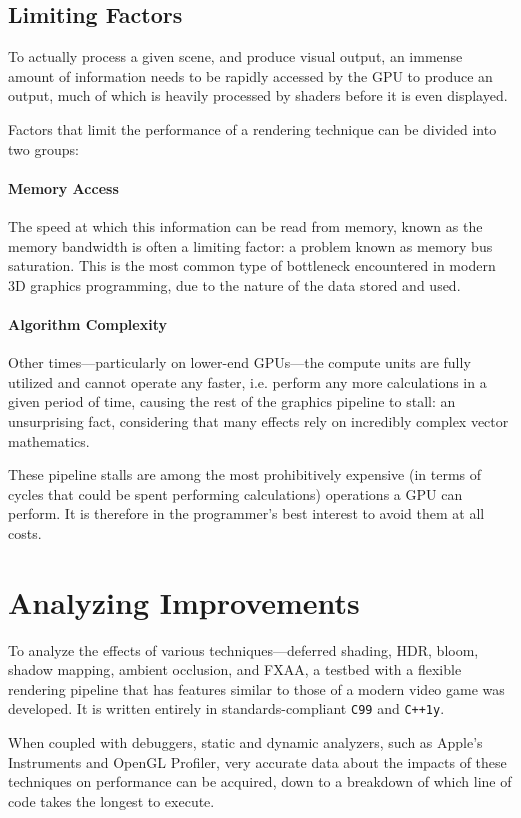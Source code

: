 \documentclass[11pt, oneside]{report}
\begin{document}
\subsection{Limiting Factors}
To actually process a given scene, and produce visual output, an immense amount of information needs to be rapidly accessed by the \gls{GPU} to produce an output, much of which is heavily processed by \glspl{shader} before it is even displayed.

Factors that limit the performance of a rendering technique can be divided into two groups:

\paragraph{Memory Access}
The speed at which this information can be read from memory, known as the \gls{memory bandwidth} is often a limiting factor: a problem known as memory bus saturation. This is the most common type of bottleneck encountered in modern 3D graphics programming, due to the nature of the data stored and used.

\paragraph{Algorithm Complexity}
Other times---particularly on lower-end \glspl{GPU}---the \glspl{compute unit} are fully utilized and cannot operate any faster, i.e. perform any more calculations in a given period of time, causing the rest of the \gls{graphics pipeline} to stall: an unsurprising fact, considering that many effects rely on incredibly complex vector mathematics.

These pipeline stalls are among the most prohibitively expensive (in terms of cycles that could be spent performing calculations) operations a \gls{GPU} can perform. It is therefore in the programmer's best interest to avoid them at all costs.

\section{Analyzing Improvements}
To analyze the effects of various techniques—\gls{deferred shading}, \gls{HDR}, \gls{bloom}, \gls{shadow mapping}, \gls{ambient occlusion}, and \gls{FXAA}, a testbed with a flexible rendering pipeline that has features similar to those of a modern video game was developed. It is written entirely in standards-compliant \texttt{C99} and \texttt{C++1y}.

When coupled with debuggers, static and dynamic analyzers, such as Apple's Instruments and \gls{OpenGL} Profiler, very accurate data about the impacts of these techniques on performance can be acquired, down to a breakdown of which line of code takes the longest to execute.
\end{document}
